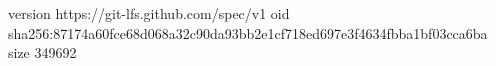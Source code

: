 version https://git-lfs.github.com/spec/v1
oid sha256:87174a60fce68d068a32c90da93bb2e1cf718ed697e3f4634fbba1bf03cca6ba
size 349692
